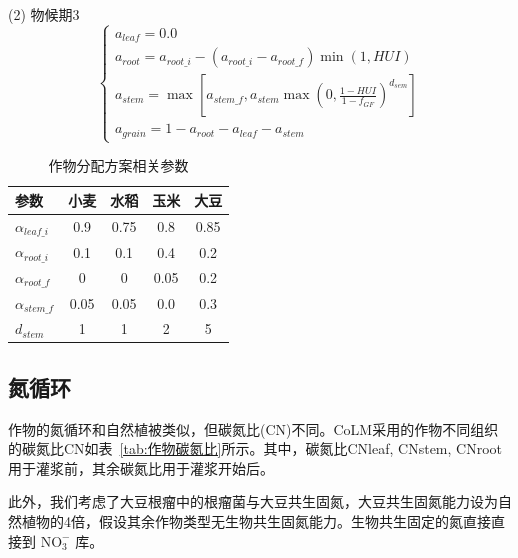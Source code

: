 (2)	物候期3 \\
\begin{equation}
  \left\{\begin{array}{c}
    a_{leaf}=0.0 \\ 
    a_{root}=a_{root\_i}-\left(a_{root\_i}-a_{root\_f}\right) \min(1, HUI) \\
    a_{stem}=\max \left[a_{stem\_f}, a_{stem} \max \left(0, \frac{1-HUI}{1-f_{GF}}\right)^{d_{sem}}\right] \\
    a_{grain}=1-a_{root}-a_{leaf}-a_{stem}
  \end{array}\right.
\end{equation}
\begin{table}[htbp]
  \centering
  \caption{作物分配方案相关参数}
  \label{tab:作物分配方案相关参数}
\begin{tabular}{@{}lcccc@{}}
  \toprule
参数       & 小麦   & 水稻   & 玉米   & 大豆   \\ \midrule
$\alpha_{leaf\_i}$ & 0.9  & 0.75 & 0.8  & 0.85 \\
$\alpha_{root\_i}$ & 0.1  & 0.1  & 0.4  & 0.2  \\
$\alpha_{root\_f}$ & 0    & 0    & 0.05 & 0.2  \\
$\alpha_{stem\_f}$ & 0.05 & 0.05 & 0.0  & 0.3  \\
$d_{stem}$    & 1    & 1    & 2    & 5   \\\bottomrule
\end{tabular}
\end{table}

\subsection{氮循环}
作物的氮循环和自然植被类似，但碳氮比(CN)不同。CoLM采用的作物不同组织的碳氮比CN如表~\ref{tab:作物碳氮比}所示。其中，碳氮比CNleaf, CNstem, CNroot用于灌浆前，其余碳氮比用于灌浆开始后。

此外，我们考虑了大豆根瘤中的根瘤菌与大豆共生固氮，大豆共生固氮能力设为自然植物的4倍，假设其余作物类型无生物共生固氮能力。生物共生固定的氮直接直接到 $\mathrm{NO_3^-}$ 库。

